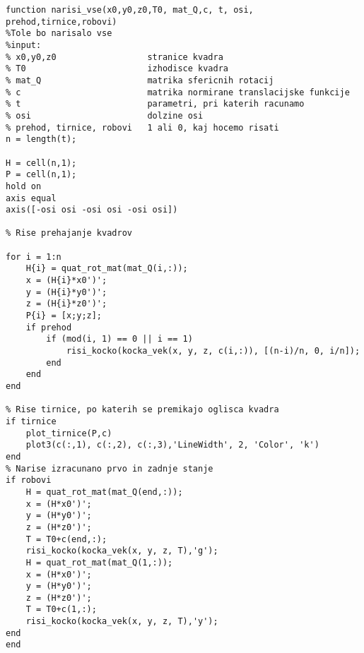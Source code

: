 \documentclass[12pt,a4paper,twoside]{article}
\theoremstyle{definition} %
\theoremstyle{plain} %
\numberwithin{equation}{section}  %
\begin{document}
\begin{lstlisting}[caption = {\color{green} narisi\_vse}]
function narisi_vse(x0,y0,z0,T0, mat_Q,c, t, osi, prehod,tirnice,robovi)
%Tole bo narisalo vse
%input:
% x0,y0,z0                  stranice kvadra
% T0                        izhodisce kvadra
% mat_Q                     matrika sfericnih rotacij
% c                         matrika normirane translacijske funkcije
% t                         parametri, pri katerih racunamo
% osi                       dolzine osi
% prehod, tirnice, robovi   1 ali 0, kaj hocemo risati
n = length(t);

H = cell(n,1);
P = cell(n,1);
hold on
axis equal
axis([-osi osi -osi osi -osi osi])

% Rise prehajanje kvadrov

for i = 1:n
    H{i} = quat_rot_mat(mat_Q(i,:));
    x = (H{i}*x0')';
    y = (H{i}*y0')';
    z = (H{i}*z0')';
    P{i} = [x;y;z];
    if prehod
        if (mod(i, 1) == 0 || i == 1)
            risi_kocko(kocka_vek(x, y, z, c(i,:)), [(n-i)/n, 0, i/n]);
        end
    end
end

% Rise tirnice, po katerih se premikajo oglisca kvadra
if tirnice
    plot_tirnice(P,c)
    plot3(c(:,1), c(:,2), c(:,3),'LineWidth', 2, 'Color', 'k')
end
% Narise izracunano prvo in zadnje stanje
if robovi
    H = quat_rot_mat(mat_Q(end,:));
    x = (H*x0')';
    y = (H*y0')';
    z = (H*z0')';
    T = T0+c(end,:);
    risi_kocko(kocka_vek(x, y, z, T),'g');
    H = quat_rot_mat(mat_Q(1,:));
    x = (H*x0')';
    y = (H*y0')';
    z = (H*z0')';
    T = T0+c(1,:);
    risi_kocko(kocka_vek(x, y, z, T),'y');
end
end
\end{lstlisting}
\end{document}
